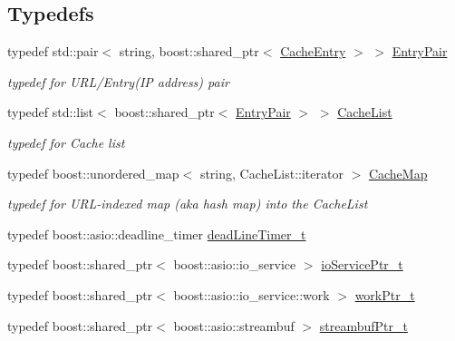 \subsection*{Typedefs}
\begin{DoxyCompactItemize}
\item 
typedef std\+::pair$<$ string, boost\+::shared\+\_\+ptr$<$ \hyperlink{structxtd_1_1network_1_1utils_1_1CacheEntry}{Cache\+Entry} $>$ $>$ \hyperlink{namespacextd_1_1network_1_1utils_a1118a93e3ee4c3aba74b90600794145b}{Entry\+Pair}
\begin{DoxyCompactList}\small\item\em typedef for U\+R\+L/\+Entry(IP address) pair \end{DoxyCompactList}\item 
typedef std\+::list$<$ boost\+::shared\+\_\+ptr$<$ \hyperlink{namespacextd_1_1network_1_1utils_a1118a93e3ee4c3aba74b90600794145b}{Entry\+Pair} $>$ $>$ \hyperlink{namespacextd_1_1network_1_1utils_a6eef494cdc6ca2b10bf4f36f6fa110ee}{Cache\+List}
\begin{DoxyCompactList}\small\item\em typedef for Cache list \end{DoxyCompactList}\item 
typedef boost\+::unordered\+\_\+map$<$ string, Cache\+List\+::iterator $>$ \hyperlink{namespacextd_1_1network_1_1utils_aa648e4975dce81f2fd0a9999f684781d}{Cache\+Map}
\begin{DoxyCompactList}\small\item\em typedef for U\+R\+L-\/indexed map (aka hash map) into the Cache\+List \end{DoxyCompactList}\item 
typedef boost\+::asio\+::deadline\+\_\+timer \hyperlink{namespacextd_1_1network_1_1utils_af551b4a44731a154a57b9447dac595cd}{dead\+Line\+Timer\+\_\+t}
\item 
typedef boost\+::shared\+\_\+ptr$<$ boost\+::asio\+::io\+\_\+service $>$ \hyperlink{namespacextd_1_1network_1_1utils_a67dfba91438896976d636d5aea36c848}{io\+Service\+Ptr\+\_\+t}
\item 
typedef boost\+::shared\+\_\+ptr$<$ boost\+::asio\+::io\+\_\+service\+::work $>$ \hyperlink{namespacextd_1_1network_1_1utils_a9e0bae7b0da2b42ca8930a927f3a7c4d}{work\+Ptr\+\_\+t}
\item 
typedef boost\+::shared\+\_\+ptr$<$ boost\+::asio\+::streambuf $>$ \hyperlink{namespacextd_1_1network_1_1utils_aaaf1b50be1864a40d85efd18979631e1}{streambuf\+Ptr\+\_\+t}
\item 

\end{DoxyCompactItemize}
